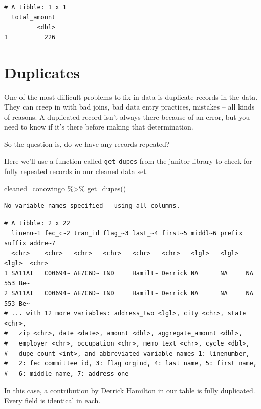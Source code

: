 \documentclass[
  letterpaper,
  DIV=11,
  numbers=noendperiod]{scrreprt}
\newenvironment{Shaded}{\begin{snugshade}}{\end{snugshade}}
\newcommand{\FunctionTok}[1]{\textcolor[rgb]{0.28,0.35,0.67}{#1}}
\newcommand{\NormalTok}[1]{\textcolor[rgb]{0.00,0.23,0.31}{#1}}
\newcommand{\SpecialCharTok}[1]{\textcolor[rgb]{0.37,0.37,0.37}{#1}}
\begin{document}
\begin{verbatim}
# A tibble: 1 x 1
  total_amount
         <dbl>
1          226
\end{verbatim}

\hypertarget{duplicates}{%
\section{Duplicates}\label{duplicates}}

One of the most difficult problems to fix in data is duplicate records
in the data. They can creep in with bad joins, bad data entry practices,
mistakes -- all kinds of reasons. A duplicated record isn't always there
because of an error, but you need to know if it's there before making
that determination.

So the question is, do we have any records repeated?

Here we'll use a function called \texttt{get\_dupes} from the janitor
library to check for fully repeated records in our cleaned data set.

\begin{Shaded}
\begin{Highlighting}[]
\NormalTok{cleaned\_conowingo }\SpecialCharTok{\%\textgreater{}\%}
  \FunctionTok{get\_dupes}\NormalTok{()}
\end{Highlighting}
\end{Shaded}

\begin{verbatim}
No variable names specified - using all columns.
\end{verbatim}

\begin{verbatim}
# A tibble: 2 x 22
  linenu~1 fec_c~2 tran_id flag_~3 last_~4 first~5 middl~6 prefix suffix addre~7
  <chr>    <chr>   <chr>   <chr>   <chr>   <chr>   <lgl>   <lgl>  <lgl>  <chr>  
1 SA11AI   C00694~ AE7C6D~ IND     Hamilt~ Derrick NA      NA     NA     553 Be~
2 SA11AI   C00694~ AE7C6D~ IND     Hamilt~ Derrick NA      NA     NA     553 Be~
# ... with 12 more variables: address_two <lgl>, city <chr>, state <chr>,
#   zip <chr>, date <date>, amount <dbl>, aggregate_amount <dbl>,
#   employer <chr>, occupation <chr>, memo_text <chr>, cycle <dbl>,
#   dupe_count <int>, and abbreviated variable names 1: linenumber,
#   2: fec_committee_id, 3: flag_orgind, 4: last_name, 5: first_name,
#   6: middle_name, 7: address_one
\end{verbatim}

In this case, a contribution by Derrick Hamilton in our table is fully
duplicated. Every field is identical in each.
\end{document}
